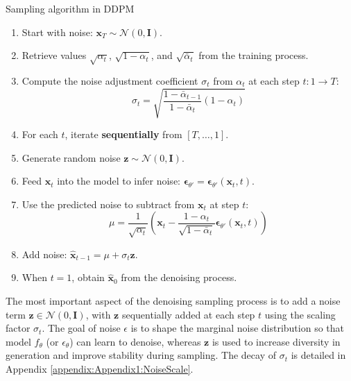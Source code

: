 \begin{algorithm}[H]
	\caption{Sampling algorithm in DDPM}
	\label{alg:samplingddpm}
	\setlength{\baselineskip}{10pt}
	\begin{enumerate}
		\item Start with noise: $\mathbf{x}_T \sim \mathcal{N}(0, \mathbf{I})$.
		
		\item Retrieve values $\sqrt{\alpha_t}$, $\sqrt{1 - \alpha_t}$, and $\sqrt{\bar{\alpha}_t}$ from the training process.
		
		\item Compute the noise adjustment coefficient $\sigma_t$ from $\alpha_t$ at each step $t: 1 \rightarrow T$:
		\[
		\sigma_t = \sqrt{\frac{1 - \bar{\alpha}_{t-1}}{1 - \bar{\alpha}_t} (1 - \alpha_t)}
		\]
		
		\item For each $t$, iterate \textbf{sequentially} from $[T, \dots, 1]$.
		
		\item Generate random noise $\mathbf{z} \sim \mathcal{N}(0, \mathbf{I})$.
		
		\item Feed $\mathbf{x}_t$ into the model to infer noise: $\boldsymbol{\epsilon}_{\theta'} = \boldsymbol{\epsilon}_{\theta'}(\mathbf{x}_t, t)$.
		
		\item Use the predicted noise to subtract from $\mathbf{x}_t$ at step $t$:
		\[
		\mu = \frac{1}{\sqrt{\alpha_t}} \left( \mathbf{x}_t - \frac{1 - \alpha_t}{\sqrt{1 - \bar{\alpha}_t}} \boldsymbol{\epsilon}_{\theta'}(\mathbf{x}_t, t) \right)
		\]
		
		\item Add noise: $\hat{\mathbf{x}}_{t-1} = \mu + \sigma_t \mathbf{z}$.
		
		\item When $t = 1$, obtain $\hat{\mathbf{x}}_0$ from the denoising process.
	\end{enumerate}
\end{algorithm}

The most important aspect of the denoising sampling process is to add a noise term $\mathbf{z} \in \mathcal{N}(0, \mathbf{I})$, with $\mathbf{z}$ sequentially added at each step $t$ using the scaling factor $\sigma_t$. The goal of noise $\epsilon$ is to shape the marginal noise distribution so that model $f_\theta$ (or $\epsilon_{\theta}$) can learn to denoise, whereas $\mathbf{z}$ is used to increase diversity in generation and improve stability during sampling. The decay of $\sigma_t$ is detailed in Appendix \autoref{appendix:Appendix1:NoiseScale}.


